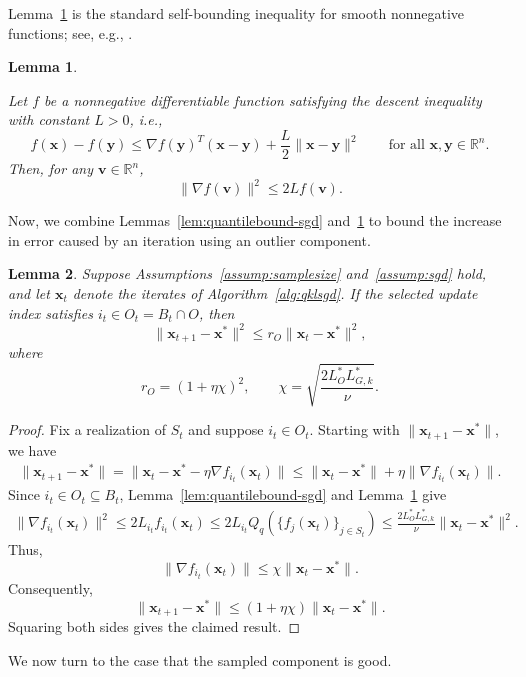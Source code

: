 \documentclass[11pt]{article}
\newcommand{\ve}[1]{\mathbf{#1}}
\newtheorem{lem}{Lemma}
\begin{document}
Lemma~\ref{lem:gradbound} is the standard self-bounding inequality for smooth nonnegative functions; see, e.g., \cite[Lemma 4]{li2019convergence}.


\begin{lem}\label{lem:gradbound}

Let $f$ be a nonnegative differentiable function satisfying the descent
inequality with constant $L>0$, i.e.,
\[
f(\ve{x})-f(\ve{y})
\le
\nabla f(\ve{y})^T(\ve{x}-\ve{y})
+\frac{L}{2}\|\ve{x}-\ve{y}\|^2
\qquad
\text{for all }\ve{x},\ve{y}\in\mathbb{R}^n.
\]
Then, for any $\ve{v}\in\mathbb{R}^n$,
\[
\|\nabla f(\ve{v})\|^2\le 2L f(\ve{v}).
\]
\end{lem}


{Now, we combine Lemmas~\ref{lem:quantilebound-sgd} and~\ref{lem:gradbound} to bound the increase in error caused by an iteration using an outlier component.}

\begin{lem}\label{lem:corruptProjection-sgd}
Suppose {Assumptions~\ref{assump:samplesize} and~\ref{assump:sgd}} hold, and let $\ve{x}_t$ denote the iterates
of Algorithm~\ref{alg:qklsgd}. If the selected update index satisfies
$i_t\in O_t = B_t\cap O$, then
\[
\|\ve{x}_{t+1}-\ve{x}^*\|^2
\le
r_O\|\ve{x}_t-\ve{x}^*\|^2,
\]
where
\[
r_O=(1+\eta \chi)^2,
\qquad
\chi=
\sqrt{
\frac{2L_{O}^*L_{G,k}^*}{\nu}
}.
\]
\end{lem}

\begin{proof}
Fix a realization of $S_t$ and suppose $i_t\in O_t$. Starting with
$\|\ve{x}_{t+1}-\ve{x}^*\|$, we have
\begin{align*}
\|\ve{x}_{t+1}-\ve{x}^*\|
=
\|\ve{x}_t-\ve{x}^*-\eta\nabla f_{i_t}(\ve{x}_t)\| \le
\|\ve{x}_t-\ve{x}^*\|
+
\eta\|\nabla f_{i_t}(\ve{x}_t)\|.
\end{align*}
Since $i_t\in O_t\subseteq B_t$, Lemma~\ref{lem:quantilebound-sgd}  and Lemma~\ref{lem:gradbound}
give
\begin{align*}
\|\nabla f_{i_t}(\ve{x}_t)\|^2
\le
2L_{i_t} f_{i_t}(\ve{x}_t)
\le
2L_{i_t} Q_q(\{f_j(\ve{x}_t)\}_{j\in S_t})
\le
\frac{2L_{O}^*L_{G,k}^*}{\nu}
\|\ve{x}_t-\ve{x}^*\|^2.
\end{align*}
Thus,
\[
\|\nabla f_{i_t}(\ve{x}_t)\|
\le
\chi\|\ve{x}_t-\ve{x}^*\|.
\]
Consequently,
\[
\|\ve{x}_{t+1}-\ve{x}^*\|
\le
(1+\eta \chi)
\|\ve{x}_t-\ve{x}^*\|.
\]
Squaring both sides gives the claimed result.
\end{proof}

{We now turn to the case that the sampled component is good.}
\end{document}
